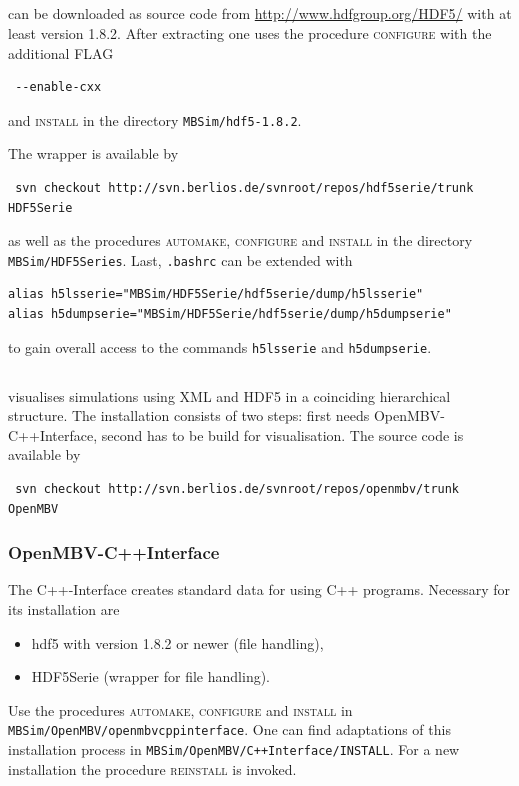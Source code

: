 \subsection{\HDF}
\HDF can be downloaded as source code from \url{http://www.hdfgroup.org/HDF5/} with at least version 1.8.2. After extracting one uses the procedure \textsc{configure} with the additional FLAG
\begin{verbatim}
 --enable-cxx
\end{verbatim}
and \textsc{install} in the directory \texttt{MBSim/hdf5-1.8.2}.

The \HDF wrapper is available by
\begin{verbatim}
 svn checkout http://svn.berlios.de/svnroot/repos/hdf5serie/trunk HDF5Serie
\end{verbatim}
as well as the procedures \textsc{automake, configure} and \textsc{install} in the directory \texttt{MBSim/HDF5Series}. Last, \texttt{.bashrc} can be extended with
\begin{verbatim}
alias h5lsserie="MBSim/HDF5Serie/hdf5serie/dump/h5lsserie"
alias h5dumpserie="MBSim/HDF5Serie/hdf5serie/dump/h5dumpserie"
\end{verbatim}
to gain overall access to the commands \texttt{h5lsserie} and \texttt{h5dumpserie}.

\subsection{\OpenMBV{}}
\OpenMBV{} visualises \MBSim{} simulations using XML and HDF5 in a coinciding hierarchical structure. The installation consists of two steps: first \MBSim{} needs \textsf{OpenMBV-C++Interface}, second \OpenMBV{} has to be build for visualisation. The source code is available by
\begin{verbatim}
 svn checkout http://svn.berlios.de/svnroot/repos/openmbv/trunk OpenMBV
\end{verbatim}

\subsubsection{OpenMBV-C++Interface}
The C++-Interface creates standard data for \OpenMBV{} using C++ programs. 
Necessary for its installation are
\begin{itemize}
\item hdf5 with version 1.8.2 or newer (file handling),
\item HDF5Serie (wrapper for file handling).
\end{itemize}
Use the procedures \textsc{automake, configure} and \textsc{install} in \texttt{MBSim/OpenMBV/openmbvcppinterface}. One can find adaptations of this installation process in \texttt{MBSim/OpenMBV/C++Interface/INSTALL}.  For a new installation the procedure \textsc{reinstall} is invoked.

